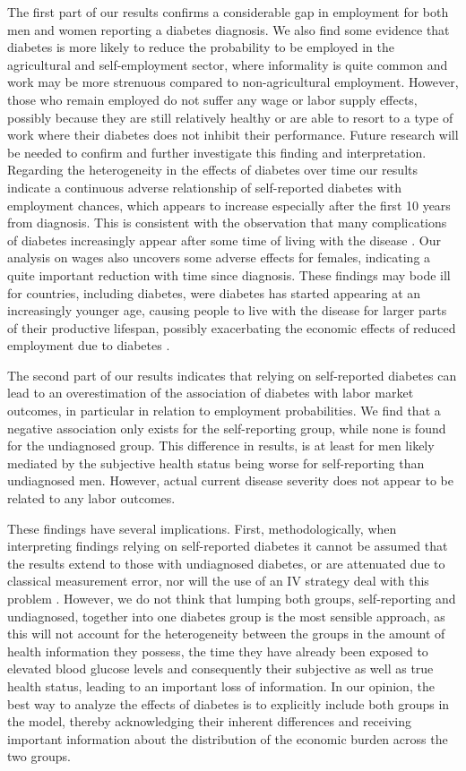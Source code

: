 \documentclass[12pt,english]{article}
\begin{document}
{The first part of our results confirms a considerable gap in employment for both men and women reporting a diabetes diagnosis. We also find some evidence that diabetes is more likely to reduce the probability to be employed in the agricultural and self-employment sector, where informality is quite common and work may be more strenuous compared to non-agricultural employment. However, those who remain employed do not suffer any wage or labor supply effects, possibly because they are still relatively healthy or are able to resort to a type of work where their diabetes does not inhibit their performance. Future research will be needed to confirm and further investigate this finding and interpretation. Regarding the heterogeneity in the effects of diabetes over time our results indicate a continuous adverse relationship of self-reported diabetes with employment chances, which appears to increase especially after the first 10 years from diagnosis. This is consistent with the observation that many complications of diabetes increasingly appear after some time of living with the disease \parencite{Adler2003}. Our analysis on wages also uncovers some adverse effects for females, indicating a quite important reduction with time since diagnosis. These findings may bode ill for countries, including diabetes, were diabetes has started appearing at an increasingly younger age, causing people to live with the disease for larger parts of their productive lifespan, possibly exacerbating the economic effects of reduced employment due to diabetes \parencite{Hu2011,Villalpando2010}.

The second part of our results indicates that relying on self-reported diabetes can lead to an overestimation of the association of diabetes with labor market outcomes, in particular in relation to employment probabilities. We find that a negative association only exists for the self-reporting group, while none is found for the undiagnosed group. This difference in results, is at least for men likely mediated by the subjective health status being worse for self-reporting than undiagnosed men. However, actual current disease severity does not appear to be related to any labor outcomes.

These findings have several implications. First, methodologically, when interpreting findings relying on self-reported diabetes it cannot be assumed that the results extend to those with undiagnosed diabetes, or are attenuated due to classical measurement error, nor will the use of an \ac{IV} strategy deal with this problem \parencite{Cawley2015}. However, we do not think that lumping both groups, self-reporting and undiagnosed, together into one diabetes group is the most sensible approach, as this will not account for the heterogeneity between the groups in the amount of health information they possess, the time they have already been exposed to elevated blood glucose levels and consequently their subjective as well as true health status, leading to an important loss of information. In our opinion, the best way to analyze the effects of diabetes is to explicitly include both groups in the model, thereby acknowledging their inherent differences and receiving important information about the distribution of the economic burden across the two groups. 

}
\end{document}
